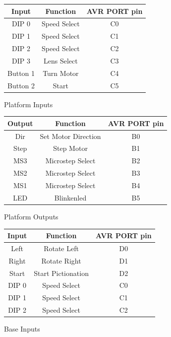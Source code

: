 \documentclass[dvips,12pt]{article}
\begin{document}
\renewcommand{\arraystretch}{1.4}%
\begin{figure}[htb]
\centering
\caption{Platform Inputs}
\begin{tabular}{|c|c|c|}
\hline
Input&Function&AVR PORT pin\\
\hline
DIP 0&Speed Select&C0\\
\hline
DIP 1&Speed Select&C1\\
\hline
DIP 2&Speed Select&C2\\
\hline
DIP 3&Lens Select&C3\\
\hline
Button 1 &Turn Motor&C4\\
\hline
Button 2 &Start&C5\\
\hline
\end{tabular}
\label{fig:platforminputs}
\end{figure}

\renewcommand{\arraystretch}{1.4}%
\begin{figure}[htb]
\centering
\caption{Platform Outputs}
\begin{tabular}{|c|c|c|}
\hline
Output&Function&AVR PORT pin\\
\hline
Dir&Set Motor Direction&B0\\
\hline
Step&Step Motor&B1\\
\hline
MS3&Microstep Select&B2\\
\hline
MS2&Microstep Select&B3\\
\hline
MS1&Microstep Select&B4\\
\hline
LED&Blinkenled&B5\\
\hline
\end{tabular}
\label{fig:platformoutputs}
\end{figure}

\renewcommand{\arraystretch}{1.4}%
\begin{figure}[htb]
\centering
\caption{Base Inputs}
\begin{tabular}{|c|c|c|}
\hline
Input&Function&AVR PORT pin\\
\hline
Left&Rotate Left&D0\\
\hline
Right&Rotate Right&D1\\
\hline
Start&Start Pictionation&D2\\
\hline
DIP 0&Speed Select&C0\\
\hline
DIP 1&Speed Select&C1\\
\hline
DIP 2&Speed Select&C2\\
\hline
\end{tabular}
\label{fig:baseinputs}
\end{figure}
\end{document}
